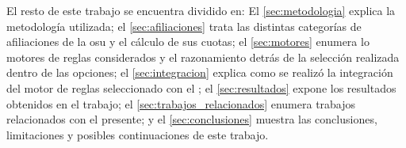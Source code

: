 El resto de este trabajo se encuentra dividido en:
El \cref{sec:metodologia} explica la metodología utilizada; 
el \cref{sec:afiliaciones} trata las distintas categorías de afiliaciones de la \acrshort{osu} y el cálculo de sus cuotas;
el \cref{sec:motores} enumera lo motores de reglas considerados y el razonamiento detrás de la selección realizada dentro de las opciones;
el \cref{sec:integracion} explica como se realizó la integración del motor de reglas seleccionado con el {\SIOSU};
el \cref{sec:resultados} expone los resultados obtenidos en el trabajo;
el \cref{sec:trabajos_relacionados} enumera trabajos relacionados con el presente; y
el \cref{sec:conclusiones} muestra las conclusiones, limitaciones y posibles continuaciones de este trabajo.